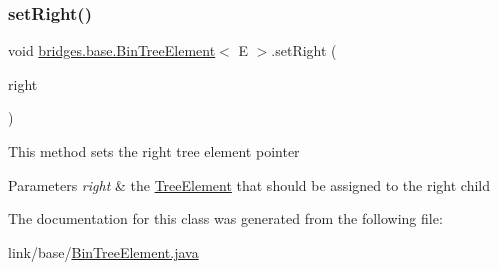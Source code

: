 \subsubsection{\texorpdfstring{set\+Right()}{setRight()}}
{\footnotesize\ttfamily void \hyperlink{classbridges_1_1base_1_1_bin_tree_element}{bridges.\+base.\+Bin\+Tree\+Element}$<$ E $>$.set\+Right (\begin{DoxyParamCaption}\item[{\hyperlink{classbridges_1_1base_1_1_bin_tree_element}{Bin\+Tree\+Element}$<$ E $>$}]{right }\end{DoxyParamCaption})}

This method sets the right tree element pointer 
\begin{DoxyParams}{Parameters}
{\em right} & the \hyperlink{classbridges_1_1base_1_1_tree_element}{Tree\+Element} that should be assigned to the right child \\
\hline
\end{DoxyParams}


The documentation for this class was generated from the following file\+:\begin{DoxyCompactItemize}
\item 
link/base/\hyperlink{_bin_tree_element_8java}{Bin\+Tree\+Element.\+java}\end{DoxyCompactItemize}

